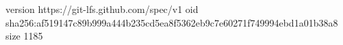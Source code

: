 version https://git-lfs.github.com/spec/v1
oid sha256:af519147c89b999a444b235cd5ea8f5362eb9c7e60271f749994ebd1a01b38a8
size 1185

